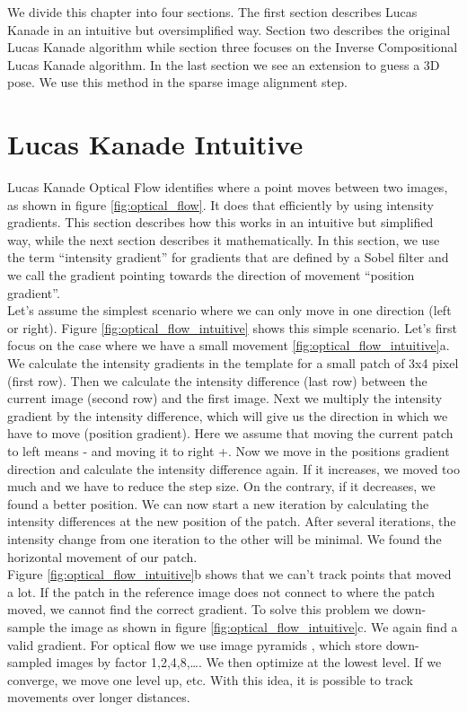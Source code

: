 \documentclass[11pt,a4paper,titlepage,oneside]{report}
\begin{document}
We divide this chapter into four sections. The first section describes Lucas Kanade in an intuitive but oversimplified way. Section two describes the original Lucas Kanade algorithm while section three focuses on the Inverse Compositional Lucas Kanade algorithm. In the last section we see an extension to guess a 3D pose. We use this method in the sparse image alignment step.

\section{Lucas Kanade Intuitive}

Lucas Kanade Optical Flow identifies where a point moves between two images, as shown in figure \ref{fig:optical_flow}. It does that efficiently by using intensity gradients. This section describes how this works in an intuitive but simplified way, while the next section describes it mathematically. In this section, we use the term ``intensity gradient'' for gradients that are defined by a Sobel filter and we call the gradient pointing towards the direction of movement ``position gradient''.\\
Let's assume the simplest scenario where we can only move in one direction (left or right). Figure \ref{fig:optical_flow_intuitive} shows this simple scenario. Let's first focus on the case where we have a small movement \ref{fig:optical_flow_intuitive}a. We calculate the intensity gradients in the template for a small patch of 3x4 pixel (first row). Then we calculate the intensity difference (last row) between the current image (second row) and the first image. Next we multiply the intensity gradient by the intensity difference, which will give us the direction in which we have to move (position gradient). Here we assume that moving the current patch to left means - and moving it to right +. Now we move in the positions gradient direction and calculate the intensity difference again. If it increases, we moved too much and we have to reduce the step size. On the contrary, if it decreases, we found a better position. We can now start a new iteration by calculating the intensity differences at the new position of the patch. After several iterations, the intensity change from one iteration to the other will be minimal. We found the horizontal movement of our patch.\\
Figure \ref{fig:optical_flow_intuitive}b shows that we can't track points that moved a lot. If the patch in the reference image does not connect to where the patch moved, we cannot find the correct gradient. To solve this problem we down-sample the image as shown in figure \ref{fig:optical_flow_intuitive}c. We again find a valid gradient. For optical flow we use image pyramids \cite{rvc}, which store down-sampled images by factor 1,2,4,8,\dots. We then optimize at the lowest level. If we converge, we move one level up, etc. With this idea, it is possible to track movements over longer distances.
\end{document}
